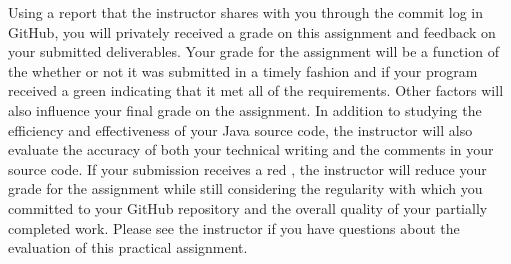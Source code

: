 \documentclass[11pt]{article}
\newcommand{\checkmark}{\ding{51}}
\newcommand{\naughtmark}{\ding{55}}
\begin{document}
Using a report that the instructor shares with you through the commit log in GitHub, you will privately received a grade
on this assignment and feedback on your submitted deliverables. Your grade for the assignment will be a function of the
whether or not it was submitted in a timely fashion and if your program received a green \checkmark{} indicating that it
met all of the requirements. Other factors will also influence your final grade on the assignment. In addition to
studying the efficiency and effectiveness of your Java source code, the instructor will also evaluate the accuracy of
both your technical writing and the comments in your source code. If your submission receives a red \naughtmark{}, the
instructor will reduce your grade for the assignment while still considering the regularity with which you committed to
your GitHub repository and the overall quality of your partially completed work. Please see the instructor if you have
questions about the evaluation of this practical assignment.


\end{document}

